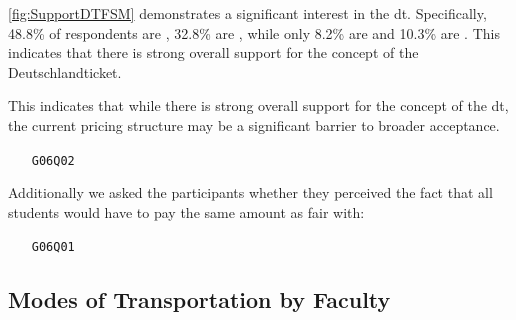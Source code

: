 \ref{fig:SupportDTFSM} demonstrates a significant interest in the \gls{dt}. Specifically, 48.8\% of respondents are , 32.8\% are , while only 8.2\% are  and 10.3\% are . This indicates that there is strong overall support for the concept of the Deutschlandticket.

This indicates that while there is strong overall support for the concept of the \gls{dt}, the current pricing structure may be a significant barrier to broader acceptance.

\begin{multicols}{2}
    {
        
    } \columnbreak {
        
    }
\end{multicols}

\clearpage

\begin{enumerate}
    \item[\texttt{G06Q02}] 
\end{enumerate}

\begin{multicols}{2}
    
    \columnbreak
    
\end{multicols}

Additionally we asked the participants whether they perceived the fact that all students would have to pay the same amount as fair with:

\begin{enumerate}
    \item[\texttt{G06Q01}] 
\end{enumerate}

\begin{multicols}{2}
    
    \columnbreak
    
\end{multicols}

\pagebreak
\subsection{Modes of Transportation by Faculty}

